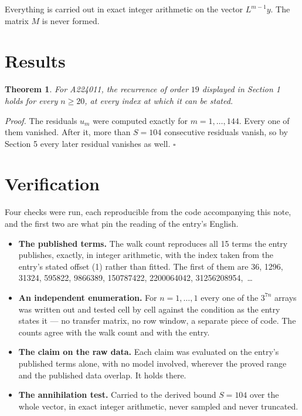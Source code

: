 \documentclass[11pt]{article}
\newtheorem{theorem}{Theorem}
\theoremstyle{definition}
\begin{document}
Everything is carried out in exact integer arithmetic on the vector $L^{m-1}y$. The matrix $M$ is never formed.

\section{Results}

\begin{theorem} For A224011, the recurrence of order $19$ displayed in Section 1 holds for every $n \ge 20$, at every index at which it can be stated.\end{theorem}

{\itshape Proof.} The residuals $u_m$ were computed exactly for $m = 1,\dots,144$. Every one of them vanished. After it, more than $S = 104$ consecutive residuals vanish, so by Section 5 every later residual vanishes as well. $\square$

\section{Verification}

Four checks were run, each reproducible from the code accompanying this note, and the first two are what pin the reading of the entry's English.

\begin{itemize}

\item {\bfseries The published terms.} The walk count reproduces all 15 terms the entry publishes, exactly, in integer arithmetic, with the index taken from the entry's stated offset (1) rather than fitted. The first of them are 36, 1296, 31324, 595822, 9866389, 150787422, 2200064042, 31256208954,~\dots

\item {\bfseries An independent enumeration.} For $n = 1,\dots,1$ every one of the $3^{7n}$ arrays was written out and tested cell by cell against the condition as the entry states it --- no transfer matrix, no row window, a separate piece of code. The counts agree with the walk count and with the entry.

\item {\bfseries The claim on the raw data.} Each claim was evaluated on the entry's published terms alone, with no model involved, wherever the proved range and the published data overlap. It holds there.

\item {\bfseries The annihilation test.} Carried to the derived bound $S = 104$ over the whole vector, in exact integer arithmetic, never sampled and never truncated.

\end{itemize}
\end{document}
